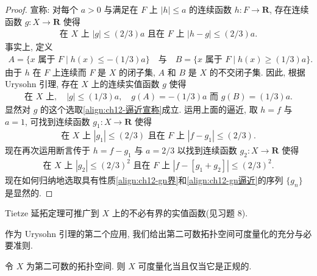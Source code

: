\documentclass[../../main.tex]{subfiles}
\begin{document}
\begin{proof}
宣称: 对每个 $a>0$ 与满足在 $F$ 上 $|h|\leqslant a$ 的连续函数 $h:F\to\mathbf{R}$, 存在连续函数 $g:X\to\mathbf{R}$ 使得
\begin{align}
\text{在 }X\text{ 上 }|g|\leqslant(2/3)a\text{ 且在 }F\text{ 上 }|h-g|\leqslant(2/3)a.\label{align:ch12-逼近宣称}
\end{align}
事实上, 定义
\begin{align*}
A=\{x\text{ 属于 }F\mid h(x)\leqslant-(1/3)a\}\quad\text{与}\quad B=\{x\text{ 属于 }F\mid h(x)\geqslant(1/3)a\}.
\end{align*}
由于 $h$ 在 $F$ 上连续而 $F$ 是 $X$ 的闭子集, $A$ 和 $B$ 是 $X$ 的不交闭子集. 因此, 根据 Urysohn 引理, 存在 $X$ 上的连续实值函数 $g$ 使得
\begin{align*}
\text{在 }X\text{ 上},\quad |g|\leqslant(1/3)a,\quad g(A)=-(1/3)a\text{ 而 }g(B)=(1/3)a.
\end{align*}
显然对 $g$ 的这个选取\eqref{align:ch12-逼近宣称}成立. 运用上面的逼近, 取 $h=f$ 与 $a=1$, 可找到连续函数 $g_{1}:X\to\mathbf{R}$ 使得
\begin{align*}
\text{在 }X\text{ 上 }|g_{1}|\leqslant(2/3)\text{ 且在 }F\text{ 上 }|f-g_{1}|\leqslant(2/3).
\end{align*}
现在再次运用断言传于 $h=f-g_{1}$ 与 $a=2/3$ 以找到连续函数 $g_{2}:X\to\mathbf{R}$ 使得
\begin{align*}
\text{在 }X\text{ 上 }|g_{2}|\leqslant(2/3)^{2}\text{ 且在 }F\text{ 上 }|f-[g_{1}+g_{2}]|\leqslant(2/3)^{2}.
\end{align*}
现在如何归纳地选取具有性质\eqref{align:ch12-gn界}和\eqref{align:ch12-gn逼近}的序列 $\{g_{n}\}$ 是显然的.
\end{proof}

Tietze 延拓定理可推广到 $X$ 上的不必有界的实值函数(见习题 8).

作为 Urysohn 引理的第二个应用, 我们给出第二可数拓扑空间可度量化的充分与必要准则.

\begin{theorem}\label{theorem:ch12-度量化}
令 $X$ 为第二可数的拓扑空间. 则 $X$ 可度量化当且仅当它是正规的.
\end{theorem}
\end{document}
